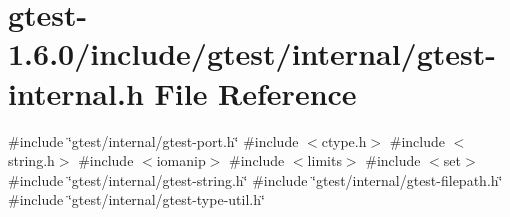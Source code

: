 \hypertarget{gtest-internal_8h}{\section{gtest-\/1.6.0/include/gtest/internal/gtest-\/internal.h \-File \-Reference}
\label{d5/da1/gtest-internal_8h}
}
{\ttfamily \#include \char`\"{}gtest/internal/gtest-\/port.\-h\char`\"{}}\*
{\ttfamily \#include $<$ctype.\-h$>$}\*
{\ttfamily \#include $<$string.\-h$>$}\*
{\ttfamily \#include $<$iomanip$>$}\*
{\ttfamily \#include $<$limits$>$}\*
{\ttfamily \#include $<$set$>$}\*
{\ttfamily \#include \char`\"{}gtest/internal/gtest-\/string.\-h\char`\"{}}\*
{\ttfamily \#include \char`\"{}gtest/internal/gtest-\/filepath.\-h\char`\"{}}\*
{\ttfamily \#include \char`\"{}gtest/internal/gtest-\/type-\/util.\-h\char`\"{}}\*
